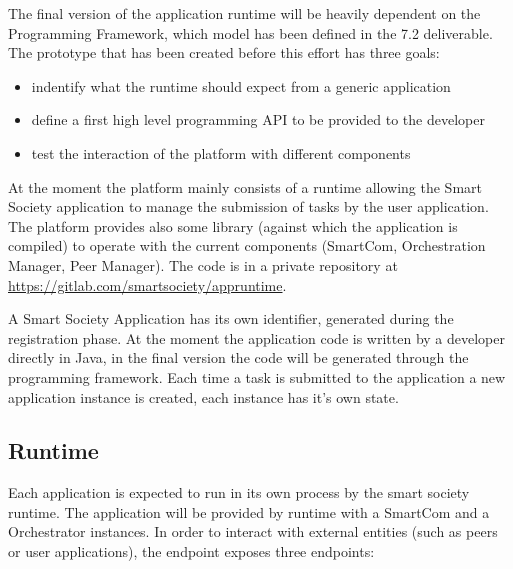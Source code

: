 The final version of the application runtime will be heavily dependent on the Programming Framework, which model has been defined in the 7.2 deliverable. The prototype that has been created before this effort has three goals:
\begin{itemize}
	\item indentify what the runtime should expect from a generic application
    \item define a first high level programming API to be provided to the developer
	\item test the interaction of the platform with different components
\end{itemize}

At the moment the platform mainly consists of a runtime allowing the Smart Society application to manage the submission of tasks by the user application. The platform provides also some library (against which the application is compiled) to operate with the current components (SmartCom, Orchestration Manager, Peer Manager). The code is in a private repository at \url{https://gitlab.com/smartsociety/appruntime}.

A Smart Society Application has its own identifier, generated during the registration phase. At the moment the application code is written by a developer directly in Java, in the final version the code will be generated through the programming framework. Each time a task is submitted to the application a new application instance is created, each instance has it's own state.

\subsection{Runtime}
Each application is expected to run in its own process by the smart society runtime. The application will be provided by runtime with a SmartCom and a Orchestrator instances. In order to interact with external entities (such as peers or user applications), the endpoint exposes three endpoints:

